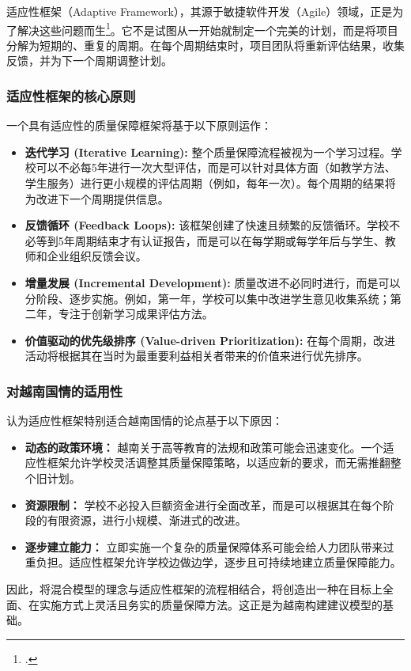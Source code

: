 适应性框架（Adaptive Framework），其源于敏捷软件开发（Agile）领域，正是为了解决这些问题而生\footcite{Wysocki2009}。它不是试图从一开始就制定一个完美的计划，而是将项目分解为短期的、重复的周期。在每个周期结束时，项目团队将重新评估结果，收集反馈，并为下一个周期调整计划。

\subsubsection{适应性框架的核心原则}
一个具有适应性的质量保障框架将基于以下原则运作：
\begin{itemize}
    \item \textbf{迭代学习 (Iterative Learning):} 整个质量保障流程被视为一个学习过程。学校可以不必每5年进行一次大型评估，而是可以针对具体方面（如教学方法、学生服务）进行更小规模的评估周期（例如，每年一次）。每个周期的结果将为改进下一个周期提供信息。
    \item \textbf{反馈循环 (Feedback Loops):} 该框架创建了快速且频繁的反馈循环。学校不必等到5年周期结束才有认证报告，而是可以在每学期或每学年后与学生、教师和企业组织反馈会议。
    \item \textbf{增量发展 (Incremental Development):} 质量改进不必同时进行，而是可以分阶段、逐步实施。例如，第一年，学校可以集中改进学生意见收集系统；第二年，专注于创新学习成果评估方法。
    \item \textbf{价值驱动的优先级排序 (Value-driven Prioritization):} 在每个周期，改进活动将根据其在当时为最重要利益相关者带来的价值来进行优先排序。
\end{itemize}

\subsubsection{对越南国情的适用性}
认为适应性框架特别适合越南国情的论点基于以下原因：
\begin{itemize}
    \item \textbf{动态的政策环境：} 越南关于高等教育的法规和政策可能会迅速变化。一个适应性框架允许学校灵活调整其质量保障策略，以适应新的要求，而无需推翻整个旧计划。
    \item \textbf{资源限制：} 学校不必投入巨额资金进行全面改革，而是可以根据其在每个阶段的有限资源，进行小规模、渐进式的改进。
    \item \textbf{逐步建立能力：} 立即实施一个复杂的质量保障体系可能会给人力团队带来过重负担。适应性框架允许学校边做边学，逐步且可持续地建立质量保障能力。
\end{itemize}
因此，将混合模型的理念与适应性框架的流程相结合，将创造出一种在目标上全面、在实施方式上灵活且务实的质量保障方法。这正是为越南构建建议模型的基础。

